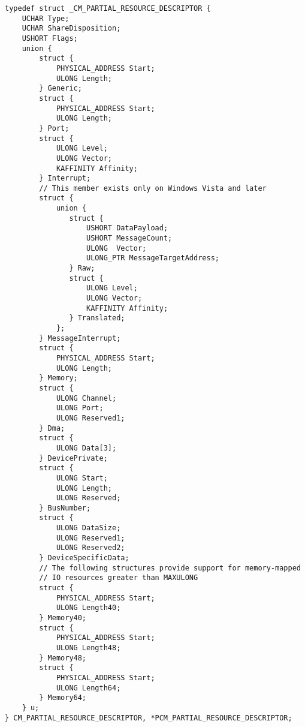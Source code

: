 \documentclass[11pt]{report}
\begin{document}
\begin{lstlisting}
typedef struct _CM_PARTIAL_RESOURCE_DESCRIPTOR {
    UCHAR Type;
    UCHAR ShareDisposition;
    USHORT Flags;
    union {
        struct {
            PHYSICAL_ADDRESS Start;
            ULONG Length;
        } Generic;
        struct {
            PHYSICAL_ADDRESS Start;
            ULONG Length;
        } Port;
        struct {
            ULONG Level;
            ULONG Vector;
            KAFFINITY Affinity;
        } Interrupt;
        // This member exists only on Windows Vista and later
        struct {
            union {
               struct {
                   USHORT DataPayload;
                   USHORT MessageCount;
                   ULONG  Vector;
                   ULONG_PTR MessageTargetAddress;
               } Raw;
               struct {
                   ULONG Level;
                   ULONG Vector;
                   KAFFINITY Affinity;
               } Translated;        
            };
        } MessageInterrupt;
        struct {
            PHYSICAL_ADDRESS Start;
            ULONG Length;
        } Memory;
        struct {
            ULONG Channel;
            ULONG Port;
            ULONG Reserved1;
        } Dma;
        struct {
            ULONG Data[3];
        } DevicePrivate;
        struct {
            ULONG Start;
            ULONG Length;
            ULONG Reserved;
        } BusNumber;
        struct {
            ULONG DataSize;
            ULONG Reserved1;
            ULONG Reserved2;
        } DeviceSpecificData;
        // The following structures provide support for memory-mapped
        // IO resources greater than MAXULONG
        struct {
            PHYSICAL_ADDRESS Start;
            ULONG Length40;
        } Memory40;
        struct {
            PHYSICAL_ADDRESS Start;
            ULONG Length48;
        } Memory48;
        struct {
            PHYSICAL_ADDRESS Start;
            ULONG Length64;
        } Memory64;
    } u;
} CM_PARTIAL_RESOURCE_DESCRIPTOR, *PCM_PARTIAL_RESOURCE_DESCRIPTOR;
\end{lstlisting}
\end{document}
